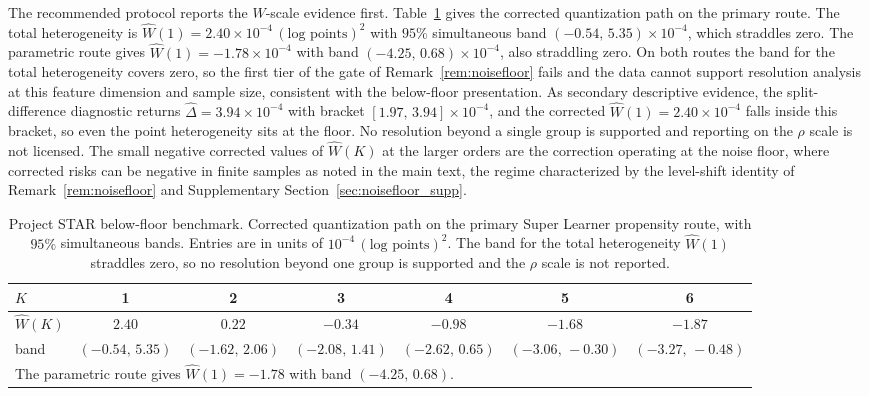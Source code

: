 \documentclass[11pt]{article}
\begin{document}
The recommended protocol reports the $W$-scale evidence first. Table~\ref{tab:app:star_null} gives the corrected quantization path on the primary route. The total heterogeneity is $\widehat W(1)=2.40\times10^{-4}\,(\text{log points})^2$ with $95\%$ simultaneous band $(-0.54,\,5.35)\times10^{-4}$, which straddles zero. The parametric route gives $\widehat W(1)=-1.78\times10^{-4}$ with band $(-4.25,\,0.68)\times10^{-4}$, also straddling zero. On both routes the band for the total heterogeneity covers zero, so the first tier of the gate of Remark~\ref{rem:noisefloor} fails and the data cannot support resolution analysis at this feature dimension and sample size, consistent with the below-floor presentation. As secondary descriptive evidence, the split-difference diagnostic returns $\widehat\Delta=3.94\times10^{-4}$ with bracket $[1.97,\,3.94]\times10^{-4}$, and the corrected $\widehat W(1)=2.40\times10^{-4}$ falls inside this bracket, so even the point heterogeneity sits at the floor. No resolution beyond a single group is supported and reporting on the $\rho$ scale is not licensed. The small negative corrected values of $\widehat W(K)$ at the larger orders are the correction operating at the noise floor, where corrected risks can be negative in finite samples as noted in the main text, the regime characterized by the level-shift identity of Remark~\ref{rem:noisefloor} and Supplementary Section~\ref{sec:noisefloor_supp}.

\begin{table}[!t]
\centering
\caption{Project STAR below-floor benchmark. Corrected quantization path on the primary Super Learner propensity route, with $95\%$ simultaneous bands. Entries are in units of $10^{-4}\,(\text{log points})^2$. The band for the total heterogeneity $\widehat W(1)$ straddles zero, so no resolution beyond one group is supported and the $\rho$ scale is not reported.}
\label{tab:app:star_null}
\footnotesize
\setlength{\tabcolsep}{3pt}
\begin{tabular}{l cccccc}
\toprule
$K$ & 1 & 2 & 3 & 4 & 5 & 6\\
\midrule
$\widehat W(K)$ & $2.40$ & $0.22$ & $-0.34$ & $-0.98$ & $-1.68$ & $-1.87$\\
band & $(-0.54,\,5.35)$ & $(-1.62,\,2.06)$ & $(-2.08,\,1.41)$ & $(-2.62,\,0.65)$ & $(-3.06,\,-0.30)$ & $(-3.27,\,-0.48)$\\
\midrule
\multicolumn{7}{l}{The parametric route gives $\widehat W(1)=-1.78$ with band $(-4.25,\,0.68)$.}\\
\bottomrule
\end{tabular}
\end{table}
\end{document}
